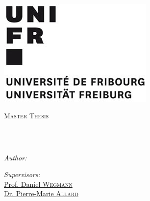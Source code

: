 \documentclass[
11pt, %
oneside, %
english, %
singlespacing, %
headsepline, %
chapterinoneline, %
]{MastersDoctoralThesis} %
\author{Marco \textsc{Visani}} %
\begin{document}
\frontmatter %

\pagestyle{plain} %


\begin{titlepage}
\includegraphics[scale=0.3]{figure/UnifrLogo} %
\begin{center}
\vspace*{.06\textheight}
{\scshape\LARGE \univname\par}\vspace{1.5cm} %

\textsc{\Large Master Thesis}\\[0.5cm] %

\HRule \\[0.4cm] %
{\huge \bfseries \ttitle\par}\vspace{0.4cm} %
\HRule \\[1.5cm] %
 
\begin{minipage}[t]{0.4\textwidth}
\begin{flushleft} \large
\emph{Author:}\\
\href{mailto:contact@vismarco.ch}{\authorname} %
\end{flushleft}
\end{minipage}
\begin{minipage}[t]{0.4\textwidth}
\begin{flushright} \large
\emph{Supervisors:} \\
\href{mailto:daniel.wegmann@unifr.ch}{Prof. Daniel \textsc{Wegmann}} \\
\href{mailto:pierre-marie.allard@unifr.ch}{Dr. Pierre-Marie \textsc{Allard}}%
\end{flushright}
\end{minipage}\\[3cm]
 

\end{center}
\end{titlepage}
\end{document}
